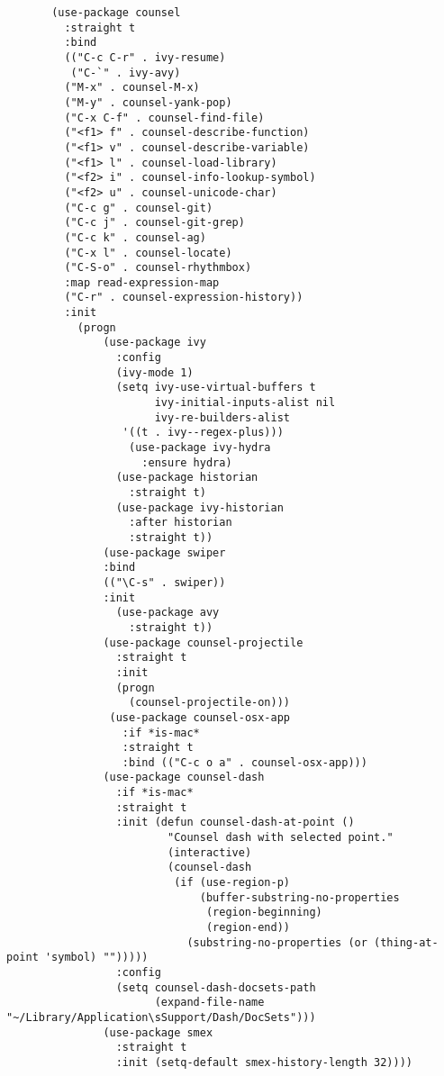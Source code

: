 \documentclass[11pt]{article}
\begin{document}
\begin{verbatim}
       (use-package counsel
         :straight t
         :bind
         (("C-c C-r" . ivy-resume)
          ("C-`" . ivy-avy)
         ("M-x" . counsel-M-x)
         ("M-y" . counsel-yank-pop)
         ("C-x C-f" . counsel-find-file)
         ("<f1> f" . counsel-describe-function)
         ("<f1> v" . counsel-describe-variable)
         ("<f1> l" . counsel-load-library)
         ("<f2> i" . counsel-info-lookup-symbol)
         ("<f2> u" . counsel-unicode-char)
         ("C-c g" . counsel-git)
         ("C-c j" . counsel-git-grep)
         ("C-c k" . counsel-ag)
         ("C-x l" . counsel-locate)
         ("C-S-o" . counsel-rhythmbox)
         :map read-expression-map
         ("C-r" . counsel-expression-history))
         :init
           (progn
               (use-package ivy
                 :config
                 (ivy-mode 1)
                 (setq ivy-use-virtual-buffers t
                       ivy-initial-inputs-alist nil
                       ivy-re-builders-alist
             	  '((t . ivy--regex-plus)))
                   (use-package ivy-hydra
                     :ensure hydra)
                 (use-package historian
                   :straight t)
                 (use-package ivy-historian
                   :after historian
                   :straight t))
               (use-package swiper
               :bind
               (("\C-s" . swiper))
               :init
                 (use-package avy
                   :straight t))
               (use-package counsel-projectile
                 :straight t
                 :init
                 (progn
                   (counsel-projectile-on)))
                (use-package counsel-osx-app
                  :if *is-mac*
                  :straight t
                  :bind (("C-c o a" . counsel-osx-app)))
               (use-package counsel-dash
                 :if *is-mac*
                 :straight t
                 :init (defun counsel-dash-at-point ()
                         "Counsel dash with selected point."
                         (interactive)
                         (counsel-dash
                          (if (use-region-p)
                              (buffer-substring-no-properties
                               (region-beginning)
                               (region-end))
                            (substring-no-properties (or (thing-at-point 'symbol) "")))))
                 :config
                 (setq counsel-dash-docsets-path
                       (expand-file-name "~/Library/Application\sSupport/Dash/DocSets")))
               (use-package smex
                 :straight t
                 :init (setq-default smex-history-length 32))))
\end{verbatim}
\end{document}
